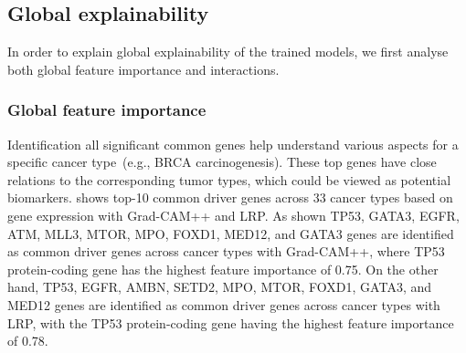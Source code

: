 \subsection{Global explainability}
In order to explain global explainability of the trained models, we first analyse both global feature importance and interactions. 

\subsubsection{Global feature importance}
Identification all significant common genes help understand various aspects for a specific cancer type~(e.g., BRCA carcinogenesis). These top genes have close relations to the corresponding tumor types, which could be viewed as potential biomarkers.  shows top-10 common driver genes across 33 cancer types based on gene expression with Grad-CAM++ and LRP. As shown TP53, GATA3, EGFR, ATM, MLL3, MTOR, MPO, FOXD1, MED12, and GATA3 genes are identified as common driver genes across cancer types with Grad-CAM++, where TP53 protein-coding gene has the highest feature importance of 0.75. On the other hand, TP53, EGFR, AMBN, SETD2, MPO, MTOR, FOXD1, GATA3, and MED12 genes are identified as common driver genes across cancer types with LRP, with the TP53 protein-coding gene having the highest feature importance of 0.78. 


